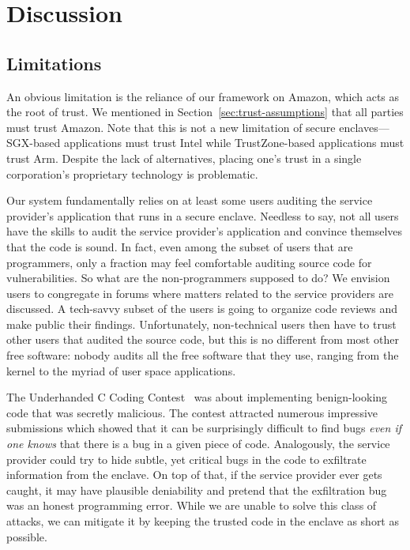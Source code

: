 \section{Discussion}
\label{sec:discussion}

\subsection{Limitations}

An obvious limitation is the reliance of our framework on Amazon, which acts as the root of trust.  We mentioned in Section~\ref{sec:trust-assumptions} that all parties must trust Amazon.  Note that this is not a new limitation of secure enclaves---SGX-based applications must trust Intel while TrustZone-based applications must trust Arm.  Despite the lack of alternatives, placing one's trust in a single corporation's proprietary technology is problematic.

Our system fundamentally relies on at least some users auditing the service provider's application that runs in a secure enclave.  Needless to say, not all users have the skills to audit the service provider's application and convince themselves that the code is sound.  In fact, even among the subset of users that are programmers, only a fraction may feel comfortable auditing source code for vulnerabilities.  So what are the non-programmers supposed to do?  We envision users to congregate in forums where matters related to the service providers are discussed.  A tech-savvy subset of the users is going to organize code reviews and make public their findings.  Unfortunately, non-technical users then have to trust other users that audited the source code, but this is no different from most other free software: nobody audits all the free software that they use, ranging from the kernel to the myriad of user space applications.

The Underhanded C Coding Contest~\cite{underhanded-c} was about implementing benign-looking code that was secretly malicious.  The contest attracted numerous impressive submissions which showed that it can be surprisingly difficult to find bugs \emph{even if one knows} that there is a bug in a given piece of code.  Analogously, the service provider could try to hide subtle, yet critical bugs in the code to exfiltrate information from the enclave.  On top of that, if the service provider ever gets caught, it may have plausible deniability and pretend that the exfiltration bug was an honest programming error.  While we are unable to solve this class of attacks, we can mitigate it by keeping the trusted code in the enclave as short as possible.